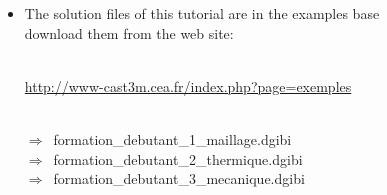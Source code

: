 \label{complements}

\begin{frame}{}
  \begin{itemize}
    \item {}
             {The solution files of this tutorial are in the examples base\\
              download them from the web site:}\\~\\
    \begin{center}
      \url{http://www-cast3m.cea.fr/index.php?page=exemples}\\~\\
    \end{center}
    $\Rightarrow$~formation\_debutant\_1\_maillage.dgibi\\
    $\Rightarrow$~formation\_debutant\_2\_thermique.dgibi\\
    $\Rightarrow$~formation\_debutant\_3\_mecanique.dgibi
  \end{itemize}
\end{frame}

